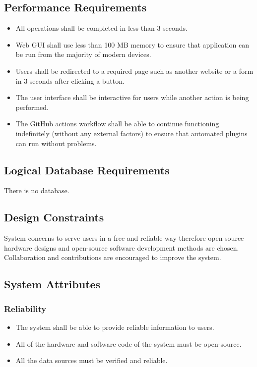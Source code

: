 \documentclass[a4paper]{article}
\begin{document}
        \subsection{Performance Requirements}

        \begin{itemize}
            \item All operations shall be completed in less than 3 seconds.
            \item Web GUI shall use less than 100 MB memory to ensure that application can be run from the majority of modern devices.
            \item Users shall be redirected to a required page such as another website or a form in 3 seconds after clicking a button.
            \item The user interface shall be interactive for users while another action is being performed.
            \item The GitHub actions workflow shall be able to continue functioning indefinitely (without any external factors) to ensure
            that automated plugins can run without problems.
        \end{itemize}

        \subsection{Logical Database Requirements}


        There is no database.

        \subsection{Design Constraints}

        System concerns to serve users in a free and reliable way therefore open source hardware designs
        and open-source software development methods are chosen. Collaboration and contributions are
        encouraged to improve the system.

        \subsection{System Attributes}
            \subsubsection{Reliability}
            \begin{itemize}
                \item The system shall be able to provide reliable information to users.
                \item All of the hardware and software code of the system must be open-source.
                \item All the data sources must be verified and reliable.
            \end{itemize}
\end{document}
